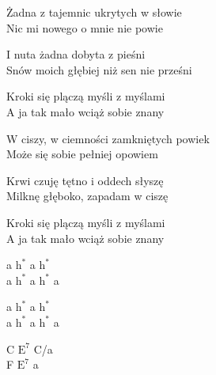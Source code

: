 \begin{text}
    Żadna z tajemnic ukrytych w słowie\\
    Nic mi nowego o mnie nie powie

    I nuta żadna dobyta z pieśni\\
    Snów moich głębiej niż sen nie prześni

    Kroki się plączą myśli z myślami\\
    A ja tak mało wciąż sobie znany

    W ciszy, w ciemności zamkniętych powiek\\
    Może się sobie pełniej opowiem

    Krwi czuję tętno i oddech słyszę\\
    Milknę głęboko, zapadam w ciszę

    Kroki się plączą myśli z myślami\\
    A ja tak mało wciąż sobie znany
\end{text}
\begin{chord}
    a $\mathrm{h^{*}}$ a $\mathrm{h^{*}}$\\
    a $\mathrm{h^{*}}$ a $\mathrm{h^{*}}$ a

    a $\mathrm{h^{*}}$ a $\mathrm{h^{*}}$\\
    a $\mathrm{h^{*}}$ a $\mathrm{h^{*}}$ a

    C $\mathrm{E^{7}}$ C/a\\
    F $\mathrm{E^{7}}$ a

\end{chord}
